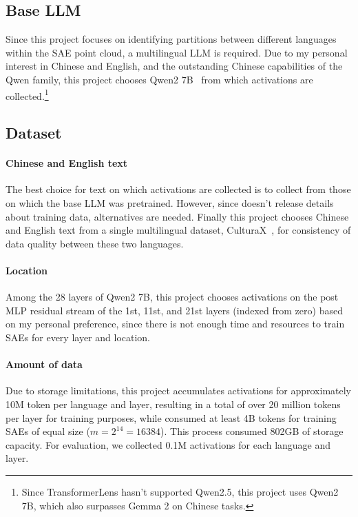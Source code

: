 \documentclass{article}
\begin{document}
\subsection{Base LLM}
\label{sec:base-llm}

Since this project focuses on identifying partitions between different languages within the SAE
point cloud, a multilingual LLM is required. Due to my personal interest in Chinese and English, and
the outstanding Chinese capabilities of the Qwen family, this project chooses Qwen2
7B~\citep{yang2024Qwen2} from which activations are collected.\footnote{Since TransformerLens hasn't
  supported Qwen2.5, this project uses Qwen2 7B, which also surpasses Gemma 2 on Chinese tasks.}

\subsection{Dataset}
\label{sec:dataset}

\paragraph{Chinese and English text}

The best choice for text on which activations are collected is to collect from those on which the
base LLM was pretrained. However, since \cite{yang2024Qwen2} doesn't release details about training
data, alternatives are needed. Finally this project chooses Chinese and English text from a single
multilingual dataset, CulturaX~\citep{nguyen2023CulturaX}, for consistency of data quality between
these two languages.

\paragraph{Location}

Among the 28 layers of Qwen2 7B, this project chooses activations on the post MLP residual stream of
the 1st, 11st, and 21st layers (indexed from zero) based on my personal preference, since there is
not enough time and resources to train SAEs for every layer and location.

\paragraph{Amount of data}

Due to storage limitations, this project accumulates activations for approximately 10M token per
language and layer, resulting in a total of over 20 million tokens per layer for training purposes,
while \cite{lieberum2024Gemma} consumed at least 4B tokens for training SAEs of equal size
(\(m=2^{14}=16384\)). This process consumed 802GB of storage capacity. For evaluation, we collected
0.1M activations for each language and layer.
\end{document}
